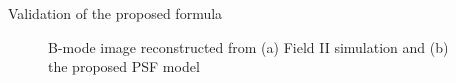 {\begin{block}{Validation of the proposed formula}
\begin{figure}
		\hfill%
		\caption{B-mode image reconstructed from (a) Field II simulation and (b) the proposed PSF model}
	\end{figure}
\end{block}
}%